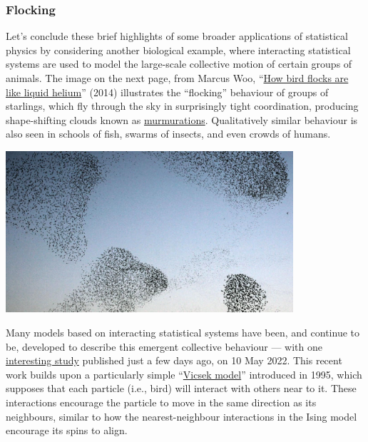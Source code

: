 \subsubsection*{Flocking}
Let's conclude these brief highlights of some broader applications of statistical physics by considering another biological example, where interacting statistical systems are used to model the large-scale collective motion of certain groups of animals.
The image on the next page, from Marcus Woo, ``\href{https://www.sciencemag.org/news/2014/07/how-bird-flocks-are-liquid-helium}{How bird flocks are like liquid helium}'' (2014) illustrates the ``flocking'' behaviour of groups of starlings, which fly through the sky in surprisingly tight coordination, producing shape-shifting clouds known as \href{https://www.youtube.com/watch?v=V4f_1_r80RY}{murmurations}.
Qualitatively similar behaviour is also seen in schools of fish, swarms of insects, and even crowds of humans.

\begin{center}\includegraphics[width=0.8\textwidth]{figs/unit10_flock.pdf}\end{center}

Many models based on interacting statistical systems have been, and continue to be, developed to describe this emergent collective behaviour --- with one \href{https://doi.org/10.1038/s41467-022-29883-4}{interesting study} published just a few days ago, on 10 May 2022.
This recent work builds upon a particularly simple ``\href{https://en.wikipedia.org/wiki/Vicsek_model}{Vicsek model}'' introduced in 1995, which supposes that each particle (i.e., bird) will interact with others near to it.
These interactions encourage the particle to move in the same direction as its neighbours, similar to how the nearest-neighbour interactions in the Ising model encourage its spins to align.

